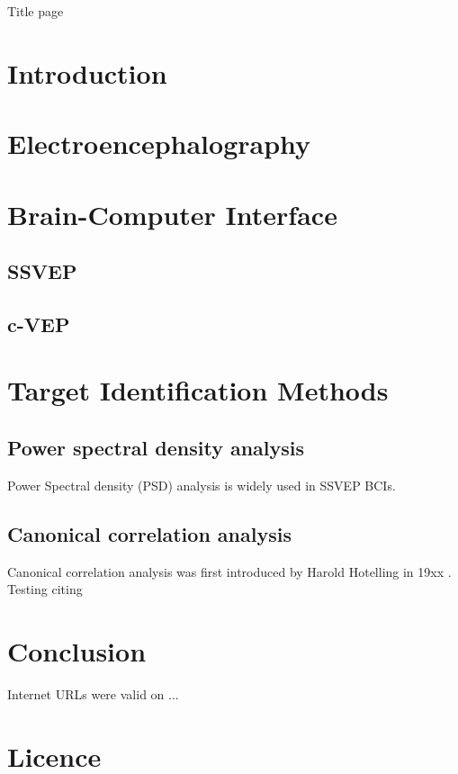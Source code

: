 \documentclass[a4paper,12pt]{report}
\begin{document}
Title page

\tableofcontents

\chapter*{Introduction}
\chapter{Electroencephalography}
\chapter{Brain-Computer Interface}
\section{SSVEP}
\section{c-VEP}
\chapter{Target Identification Methods}
\section{Power spectral density analysis}
Power Spectral density (PSD) analysis is widely used in SSVEP BCIs\cite{bin2009cca}.
\section{Canonical correlation analysis}
Canonical correlation analysis was first introduced by Harold Hotelling in 19xx . Testing citing\cite{scipy}\cite{scikit-learn}\cite{psychopy}
\chapter*{Conclusion}


Internet URLs were valid on ...

\chapter*{Licence}
\end{document}
